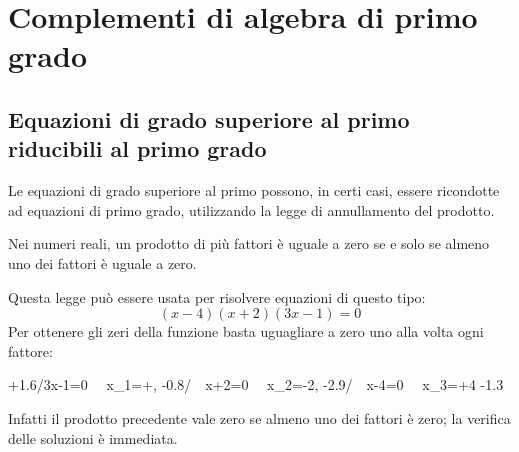 


\chapter{Complementi di algebra di primo grado}

\section{Equazioni di grado superiore al primo riducibili al primo grado}
\label{sec:compl1_eqgradosup}

Le equazioni di grado superiore al primo possono, in certi casi, essere 
ricondotte ad equazioni di primo grado, utilizzando la legge di annullamento 
del prodotto.

\begin{definizione}{}{}
 Nei numeri reali, un prodotto di più fattori è uguale a zero se e solo se 
 almeno uno dei fattori è uguale a zero.
\end{definizione}

Questa legge può essere usata per risolvere equazioni di questo tipo:
\[(x-4)(x+2)(3x-1)=0\]
Per ottenere gli zeri della funzione basta uguagliare a zero uno alla volta 
ogni fattore:
\begin{center} 
                 {+1.6/{3x-1=0~ \sRarrow ~x_1=+},
                  -0.8/{~~x+2=0~ \sRarrow ~x_2=-2},
                  -2.9/{~~x-4=0~ \sRarrow ~x_3=+4}}
                 {-1.3}
\end{center} 
Infatti il prodotto precedente vale zero se almeno uno dei fattori è zero; 
la verifica delle soluzioni è immediata.


